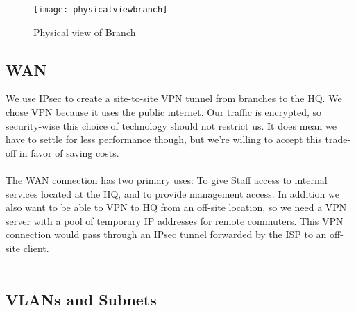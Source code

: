 \begin{figure}[H]
\caption{Physical view of Branch}
\centering
\texttt{[image: physicalviewbranch]}
\label{physicalviewbranch}
\end{figure}


\subsection{WAN}

We use IPsec to create a site-to-site VPN tunnel from branches to the HQ. We chose VPN because it uses the public internet. Our traffic is encrypted, so security-wise this choice of technology should not restrict us. It does mean we have to settle for less performance though, but we're willing to accept this trade-off in favor of saving costs. 
\\
\\


The WAN connection has two primary uses: To give Staff access to internal services located at the HQ, and to provide management access. In addition we also want to be able to VPN to HQ from an off-site location, so we need a VPN server with a pool of temporary IP addresses for remote commuters. This VPN connection would pass through an IPsec tunnel forwarded by the ISP to an off-site client.
\\
\\


\subsection{VLANs and Subnets}

